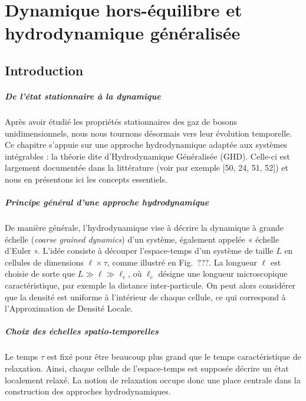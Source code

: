 \chapter{Dynamique hors-équilibre et hydrodynamique généralisée}
\label{chap:GHD}
\minitoc


\section*{Introduction}


\paragraph{De l’état stationnaire à la dynamique}  
Après avoir étudié les propriétés stationnaires des gaz de bosons unidimensionnels, nous nous tournons désormais vers leur évolution temporelle. Ce chapitre s’appuie sur une approche hydrodynamique adaptée aux systèmes intégrables : la théorie dite d’Hydrodynamique Généralisée (GHD). Celle-ci est largement documentée dans la littérature (voir par exemple [50, 24, 51, 52]) et nous en présentons ici les concepts essentiels.

\paragraph{Principe général d’une approche hydrodynamique}  
De manière générale, l’hydrodynamique vise à décrire la dynamique à grande échelle (\emph{coarse grained dynamics}) d’un système, également appelée « échelle d’Euler ». L’idée consiste à découper l’espace-temps d’un système de taille $L$ en cellules de dimensions $\ell \times \tau$, comme illustré en Fig.~???.  
La longueur $\ell$ est choisie de sorte que $L \gg \ell \gg \ell_c$, où $\ell_c$ désigne une longueur microscopique caractéristique, par exemple la distance inter-particule. On peut alors considérer que la densité est uniforme à l’intérieur de chaque cellule, ce qui correspond à l’Approximation de Densité Locale.

\paragraph{Choix des échelles spatio-temporelles}  
Le temps $\tau$ est fixé pour être beaucoup plus grand que le temps caractéristique de relaxation. Ainsi, chaque cellule de l’espace-temps est supposée décrire un état localement relaxé. La notion de relaxation occupe donc une place centrale dans la construction des approches hydrodynamiques.

